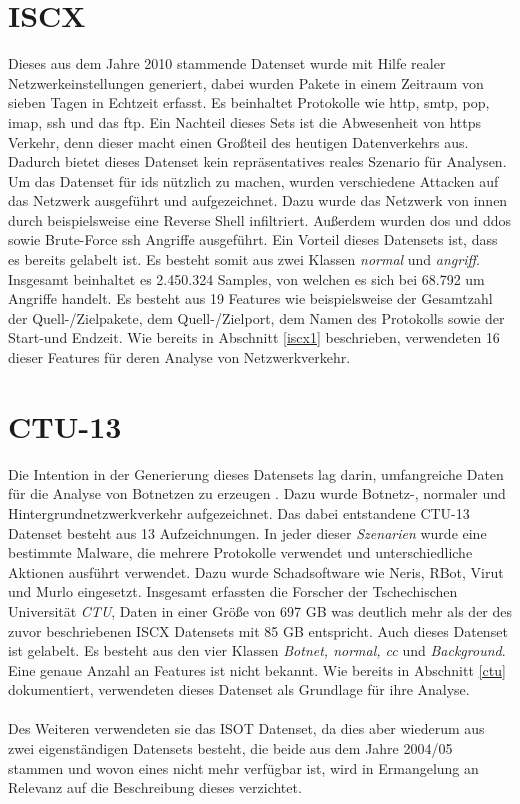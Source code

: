 \documentclass[
    12pt, %
    DIV10,
    ngerman, %
    a4paper, %
    oneside, %
    titlepage, %
    parskip=half, %
    headings=normal, %
    listof=totoc, %
    bibliography=totoc, %
    index=totoc, %
    captions=tableheading, %
    final %
]{scrreprt}
\begin{document}
\section{ISCX}
Dieses aus dem Jahre 2010 stammende Datenset wurde mit Hilfe realer Netzwerkeinstellungen generiert, dabei wurden Pakete in einem Zeitraum von sieben Tagen in Echtzeit erfasst. Es beinhaltet Protokolle wie \ac{http}, \ac{smtp}, \ac{pop}, \ac{imap}, \ac{ssh} und das \ac{ftp}. Ein Nachteil dieses Sets ist die Abwesenheit von \ac{https} Verkehr, denn dieser macht einen Gro{\ss}teil des heutigen Datenverkehrs aus. Dadurch bietet dieses Datenset kein repräsentatives reales Szenario für Analysen. Um das Datenset für \ac{ids} nützlich zu machen, wurden verschiedene Attacken auf das Netzwerk ausgeführt und aufgezeichnet. Dazu wurde das Netzwerk von innen durch beispielsweise eine Reverse Shell infiltriert. Au{\ss}erdem wurden \ac{dos} und \ac{ddos} sowie Brute-Force \ac{ssh} Angriffe ausgeführt. Ein Vorteil dieses Datensets ist, dass es bereits gelabelt ist. Es besteht somit aus zwei Klassen \emph{normal} und \emph{angriff}. Insgesamt beinhaltet es 2.450.324 Samples, von welchen es sich bei 68.792 um Angriffe handelt. Es besteht aus 19 Features wie beispielsweise der Gesamtzahl der Quell-/Zielpakete, dem Quell-/Zielport, dem Namen des Protokolls sowie der Start-und Endzeit. Wie bereits in Abschnitt \ref{iscx1} beschrieben, verwendeten \textcite{Aldwairi2018} 16 dieser Features für deren Analyse von Netzwerkverkehr.
\section{CTU-13}
Die Intention in der Generierung dieses Datensets lag darin, umfangreiche Daten für die Analyse von Botnetzen zu erzeugen \parencite{garcia2014empirical}. Dazu wurde Botnetz-, normaler und Hintergrundnetzwerkverkehr aufgezeichnet. Das dabei entstandene CTU-13 Datenset besteht aus 13 Aufzeichnungen. In jeder dieser \emph{Szenarien} wurde eine bestimmte Malware, die mehrere Protokolle verwendet und unterschiedliche Aktionen ausführt verwendet. Dazu wurde Schadsoftware wie Neris, RBot, Virut und Murlo eingesetzt. Insgesamt erfassten die Forscher der Tschechischen Universität \emph{CTU}, Daten in einer Grö{\ss}e von 697 GB was deutlich mehr als der des zuvor beschriebenen ISCX Datensets mit 85 GB entspricht. Auch dieses Datenset ist gelabelt. Es besteht aus den vier Klassen \emph{Botnet, normal, \ac{cc}} und \emph{Background}. Eine genaue Anzahl an Features ist nicht bekannt.
Wie bereits in Abschnitt \ref{ctu} dokumentiert, verwendeten \textcite{Mathur2018} dieses Datenset als Grundlage für ihre Analyse.\\\\
Des Weiteren verwendeten sie das ISOT Datenset, da dies aber wiederum aus zwei eigenständigen Datensets besteht, die beide aus dem Jahre 2004/05 stammen und wovon eines nicht mehr verfügbar ist, wird in Ermangelung an Relevanz auf die Beschreibung dieses verzichtet.
\end{document}
